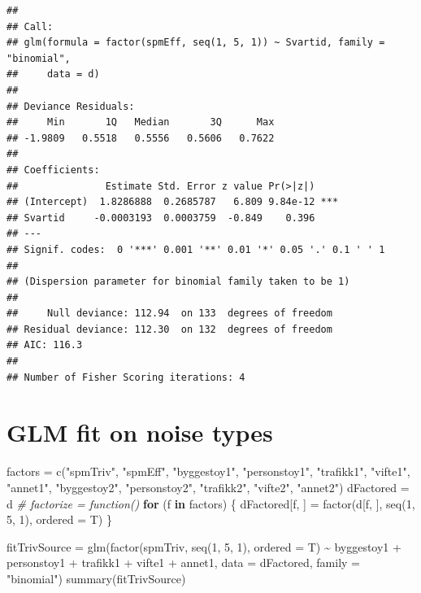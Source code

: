 \documentclass[
]{article}
\newenvironment{Shaded}{\begin{snugshade}}{\end{snugshade}}
\newcommand{\AttributeTok}[1]{\textcolor[rgb]{0.77,0.63,0.00}{#1}}
\newcommand{\CommentTok}[1]{\textcolor[rgb]{0.56,0.35,0.01}{\textit{#1}}}
\newcommand{\ControlFlowTok}[1]{\textcolor[rgb]{0.13,0.29,0.53}{\textbf{#1}}}
\newcommand{\DecValTok}[1]{\textcolor[rgb]{0.00,0.00,0.81}{#1}}
\newcommand{\FunctionTok}[1]{\textcolor[rgb]{0.00,0.00,0.00}{#1}}
\newcommand{\NormalTok}[1]{#1}
\newcommand{\OtherTok}[1]{\textcolor[rgb]{0.56,0.35,0.01}{#1}}
\newcommand{\SpecialCharTok}[1]{\textcolor[rgb]{0.00,0.00,0.00}{#1}}
\newcommand{\StringTok}[1]{\textcolor[rgb]{0.31,0.60,0.02}{#1}}
\begin{document}
\begin{verbatim}
## 
## Call:
## glm(formula = factor(spmEff, seq(1, 5, 1)) ~ Svartid, family = "binomial", 
##     data = d)
## 
## Deviance Residuals: 
##     Min       1Q   Median       3Q      Max  
## -1.9809   0.5518   0.5556   0.5606   0.7622  
## 
## Coefficients:
##               Estimate Std. Error z value Pr(>|z|)    
## (Intercept)  1.8286888  0.2685787   6.809 9.84e-12 ***
## Svartid     -0.0003193  0.0003759  -0.849    0.396    
## ---
## Signif. codes:  0 '***' 0.001 '**' 0.01 '*' 0.05 '.' 0.1 ' ' 1
## 
## (Dispersion parameter for binomial family taken to be 1)
## 
##     Null deviance: 112.94  on 133  degrees of freedom
## Residual deviance: 112.30  on 132  degrees of freedom
## AIC: 116.3
## 
## Number of Fisher Scoring iterations: 4
\end{verbatim}

\hypertarget{glm-fit-on-noise-types}{%
\section{GLM fit on noise types}\label{glm-fit-on-noise-types}}

\begin{Shaded}
\begin{Highlighting}[]
\NormalTok{factors }\OtherTok{=} \FunctionTok{c}\NormalTok{(}\StringTok{"spmTriv"}\NormalTok{, }\StringTok{"spmEff"}\NormalTok{, }\StringTok{"byggestoy1"}\NormalTok{, }\StringTok{"personstoy1"}\NormalTok{, }\StringTok{"trafikk1"}\NormalTok{, }\StringTok{"vifte1"}\NormalTok{,}
    \StringTok{"annet1"}\NormalTok{, }\StringTok{"byggestoy2"}\NormalTok{, }\StringTok{"personstoy2"}\NormalTok{, }\StringTok{"trafikk2"}\NormalTok{, }\StringTok{"vifte2"}\NormalTok{, }\StringTok{"annet2"}\NormalTok{)}
\NormalTok{dFactored }\OtherTok{=}\NormalTok{ d}
\CommentTok{\# factorize = function()}
\ControlFlowTok{for}\NormalTok{ (f }\ControlFlowTok{in}\NormalTok{ factors) \{}
\NormalTok{    dFactored[f, ] }\OtherTok{=} \FunctionTok{factor}\NormalTok{(d[f, ], }\FunctionTok{seq}\NormalTok{(}\DecValTok{1}\NormalTok{, }\DecValTok{5}\NormalTok{, }\DecValTok{1}\NormalTok{), }\AttributeTok{ordered =}\NormalTok{ T)}
\NormalTok{\}}

\NormalTok{fitTrivSource }\OtherTok{=} \FunctionTok{glm}\NormalTok{(}\FunctionTok{factor}\NormalTok{(spmTriv, }\FunctionTok{seq}\NormalTok{(}\DecValTok{1}\NormalTok{, }\DecValTok{5}\NormalTok{, }\DecValTok{1}\NormalTok{), }\AttributeTok{ordered =}\NormalTok{ T) }\SpecialCharTok{\textasciitilde{}}\NormalTok{ byggestoy1 }\SpecialCharTok{+}\NormalTok{ personstoy1 }\SpecialCharTok{+}
\NormalTok{    trafikk1 }\SpecialCharTok{+}\NormalTok{ vifte1 }\SpecialCharTok{+}\NormalTok{ annet1, }\AttributeTok{data =}\NormalTok{ dFactored, }\AttributeTok{family =} \StringTok{"binomial"}\NormalTok{)}
\FunctionTok{summary}\NormalTok{(fitTrivSource)}
\end{Highlighting}
\end{Shaded}
\end{document}

